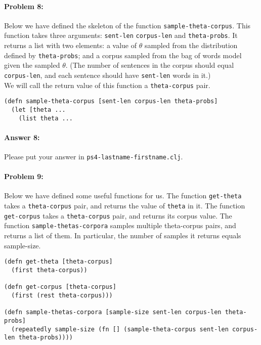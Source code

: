 \documentclass[10pt]{article}
\newcommand{\PSnum}{4}
\begin{document}
\paragraph{Problem 8:}

Below we have defined the skeleton of the function
\texttt{sample-theta-corpus}. This function takes three arguments:
\texttt{sent-len} \texttt{corpus-len} and \texttt{theta-probs}. It
returns a list with two elements: a value of $\theta$ sampled from the
distribution defined by \texttt{theta-probs}; and a corpus sampled
from the bag of words model given the sampled $\theta$. (The number of
sentences in the corpus should equal \texttt{corpus-len}, and each
sentence should have \texttt{sent-len} words in it.)
\\

\noindent We will call the return value of this function a \texttt{theta-corpus} pair.

\begin{lstlisting}
(defn sample-theta-corpus [sent-len corpus-len theta-probs]
  (let [theta ...
    (list theta ...
\end{lstlisting}

\paragraph{Answer 8:} Please put your answer in
\texttt{ps\PSnum-lastname-firstname.clj}.

\noindent\hrulefill %

\paragraph{Problem 9:}

Below we have defined some useful functions for us. The function
\texttt{get-theta} takes a \texttt{theta-corpus} pair, and returns the
value of \texttt{theta} in it. The function \texttt{get-corpus} takes
a \texttt{theta-corpus} pair, and returns its corpus value. The
function \texttt{sample-thetas-corpora} samples multiple theta-corpus
pairs, and returns a list of them. In particular, the number of
samples it returns equals sample-size.

\begin{lstlisting}
(defn get-theta [theta-corpus]
  (first theta-corpus))

(defn get-corpus [theta-corpus]
  (first (rest theta-corpus)))
  
(defn sample-thetas-corpora [sample-size sent-len corpus-len theta-probs]
  (repeatedly sample-size (fn [] (sample-theta-corpus sent-len corpus-len theta-probs))))
\end{lstlisting}
\end{document}
